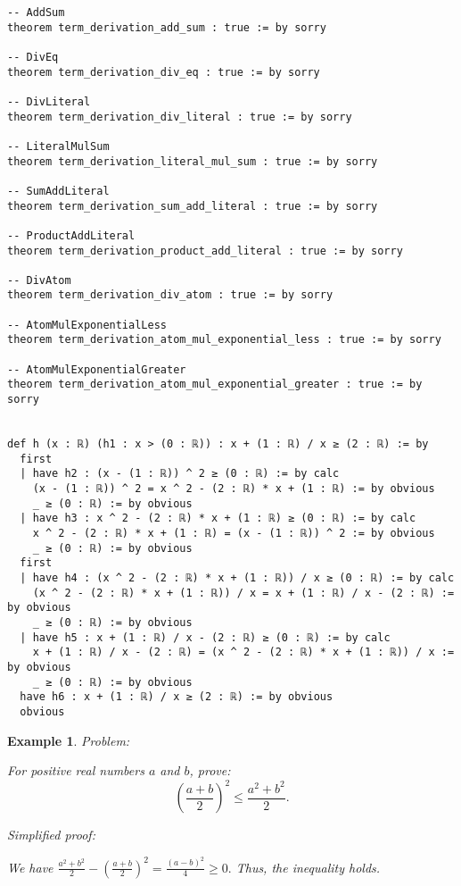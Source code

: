 \documentclass{article}
\newtheorem{example}{Example}
\begin{document}
\begin{tcolorbox}[colback=white!10, width=\linewidth]
\begin{lstlisting}[language=Lean4]
-- AddSum
theorem term_derivation_add_sum : true := by sorry

-- DivEq
theorem term_derivation_div_eq : true := by sorry

-- DivLiteral
theorem term_derivation_div_literal : true := by sorry

-- LiteralMulSum
theorem term_derivation_literal_mul_sum : true := by sorry

-- SumAddLiteral
theorem term_derivation_sum_add_literal : true := by sorry

-- ProductAddLiteral
theorem term_derivation_product_add_literal : true := by sorry

-- DivAtom
theorem term_derivation_div_atom : true := by sorry

-- AtomMulExponentialLess
theorem term_derivation_atom_mul_exponential_less : true := by sorry

-- AtomMulExponentialGreater
theorem term_derivation_atom_mul_exponential_greater : true := by sorry


def h (x : ℝ) (h1 : x > (0 : ℝ)) : x + (1 : ℝ) / x ≥ (2 : ℝ) := by
  first
  | have h2 : (x - (1 : ℝ)) ^ 2 ≥ (0 : ℝ) := by calc
    (x - (1 : ℝ)) ^ 2 = x ^ 2 - (2 : ℝ) * x + (1 : ℝ) := by obvious
    _ ≥ (0 : ℝ) := by obvious
  | have h3 : x ^ 2 - (2 : ℝ) * x + (1 : ℝ) ≥ (0 : ℝ) := by calc
    x ^ 2 - (2 : ℝ) * x + (1 : ℝ) = (x - (1 : ℝ)) ^ 2 := by obvious
    _ ≥ (0 : ℝ) := by obvious
  first
  | have h4 : (x ^ 2 - (2 : ℝ) * x + (1 : ℝ)) / x ≥ (0 : ℝ) := by calc
    (x ^ 2 - (2 : ℝ) * x + (1 : ℝ)) / x = x + (1 : ℝ) / x - (2 : ℝ) := by obvious
    _ ≥ (0 : ℝ) := by obvious
  | have h5 : x + (1 : ℝ) / x - (2 : ℝ) ≥ (0 : ℝ) := by calc
    x + (1 : ℝ) / x - (2 : ℝ) = (x ^ 2 - (2 : ℝ) * x + (1 : ℝ)) / x := by obvious
    _ ≥ (0 : ℝ) := by obvious
  have h6 : x + (1 : ℝ) / x ≥ (2 : ℝ) := by obvious
  obvious

\end{lstlisting}
\end{tcolorbox}


\begin{example}
Problem:
\begin{tcolorbox}[colback=yellow!10, width=\linewidth]
For positive real numbers $a$ and $b$, prove:
    $$\left(\frac{a+b}{2}\right)^2 \leq \frac{a^2+b^2}{2}.$$
\end{tcolorbox}

Simplified proof:
\begin{tcolorbox}[colback=blue!10, width=\linewidth]
We have
$ \frac{a^2+b^2}{2} - \left(\frac{a+b}{2}\right)^2 = \frac{(a-b)^2}{4} \ge 0. $
Thus, the inequality holds.
\end{tcolorbox}
\end{example}
\end{document}
